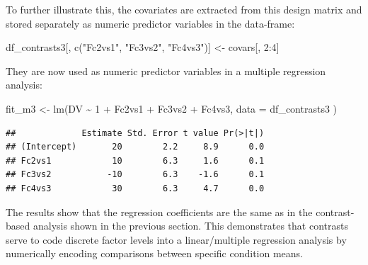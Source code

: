 \documentclass[
  12pt,
]{krantz}
\newenvironment{Shaded}{\begin{snugshade}}{\end{snugshade}}
\newcommand{\AttributeTok}[1]{\textcolor[rgb]{0.77,0.63,0.00}{#1}}
\newcommand{\DecValTok}[1]{\textcolor[rgb]{0.00,0.00,0.81}{#1}}
\newcommand{\FunctionTok}[1]{\textcolor[rgb]{0.00,0.00,0.00}{#1}}
\newcommand{\NormalTok}[1]{#1}
\newcommand{\OtherTok}[1]{\textcolor[rgb]{0.56,0.35,0.01}{#1}}
\newcommand{\SpecialCharTok}[1]{\textcolor[rgb]{0.00,0.00,0.00}{#1}}
\newcommand{\StringTok}[1]{\textcolor[rgb]{0.31,0.60,0.02}{#1}}
\theoremstyle{definition}
\theoremstyle{definition}
\theoremstyle{definition}
\theoremstyle{definition}
\theoremstyle{remark}
\begin{document}
To further illustrate this, the covariates are extracted from this design matrix and stored separately as numeric predictor variables in the data-frame:

\begin{Shaded}
\begin{Highlighting}[]
\NormalTok{df\_contrasts3[, }\FunctionTok{c}\NormalTok{(}\StringTok{"Fc2vs1"}\NormalTok{, }\StringTok{"Fc3vs2"}\NormalTok{, }\StringTok{"Fc4vs3"}\NormalTok{)] }\OtherTok{\textless{}{-}}
\NormalTok{  covars[, }\DecValTok{2}\SpecialCharTok{:}\DecValTok{4}\NormalTok{]}
\end{Highlighting}
\end{Shaded}

They are now used as numeric predictor variables in a multiple regression analysis:

\begin{Shaded}
\begin{Highlighting}[]
\NormalTok{fit\_m3 }\OtherTok{\textless{}{-}} \FunctionTok{lm}\NormalTok{(DV }\SpecialCharTok{\textasciitilde{}} \DecValTok{1} \SpecialCharTok{+}\NormalTok{ Fc2vs1 }\SpecialCharTok{+}\NormalTok{ Fc3vs2 }\SpecialCharTok{+}\NormalTok{ Fc4vs3,}
  \AttributeTok{data =}\NormalTok{ df\_contrasts3}
\NormalTok{)}
\end{Highlighting}
\end{Shaded}

\begin{Shaded}
\end{Shaded}

\begin{verbatim}
##             Estimate Std. Error t value Pr(>|t|)
## (Intercept)       20        2.2     8.9      0.0
## Fc2vs1            10        6.3     1.6      0.1
## Fc3vs2           -10        6.3    -1.6      0.1
## Fc4vs3            30        6.3     4.7      0.0
\end{verbatim}

The results show that the regression coefficients are the same as in the contrast-based analysis shown in the previous section. This demonstrates that contrasts serve to code discrete factor levels into a linear/multiple regression analysis by numerically encoding comparisons between specific condition means.
\end{document}
